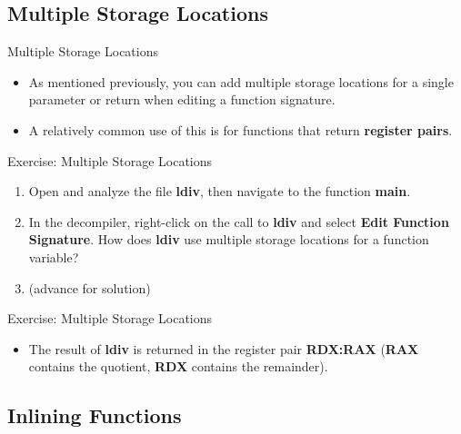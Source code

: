 \documentclass{beamer}
\begin{document}
\subsection{Multiple Storage Locations}
\begin{frame}
\begin{block}{Multiple Storage Locations}
\begin{itemize}
\item As mentioned previously, you can add multiple storage locations for a single parameter or return when editing a function signature.
\item A relatively common use of this is for functions that return \textbf{register pairs}.
\end{itemize}
\end{block}
\end{frame}

\begin{frame}
\begin{block}{Exercise: Multiple Storage Locations}
\begin{enumerate}
\item Open and analyze the file \textbf{ldiv}, then navigate to the function \textbf{main}.
\item In the decompiler, right-click on the call to \textbf{ldiv} and select \textbf{Edit Function Signature}.  How does \textbf{ldiv} use multiple storage locations for a function variable?\item[] (advance for solution)
\end{enumerate}
\end{block}
\end{frame}

\begin{frame}
\begin{block}{Exercise: Multiple Storage Locations}
\begin{itemize}
\item The result of \textbf{ldiv} is returned in the register pair \textbf{RDX:RAX} (\textbf{RAX} contains the quotient, \textbf{RDX} contains the remainder). 
\end{itemize}
\end{block}
\end{frame}

\subsection{Inlining Functions}
\end{document}
